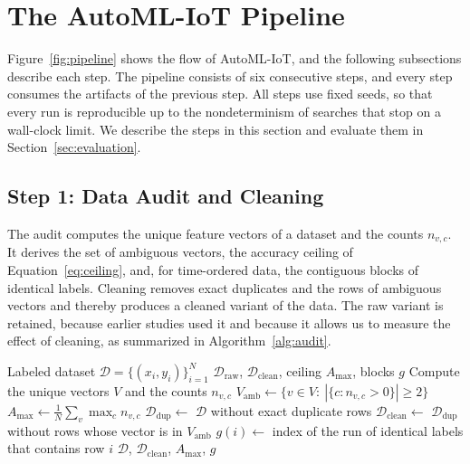 \section{The AutoML-IoT Pipeline}\label{sec:pipeline}
Figure~\ref{fig:pipeline} shows the flow of AutoML-IoT, and the following subsections describe each step. The pipeline consists of six consecutive steps, and every step consumes the artifacts of the previous step. All steps use fixed seeds, so that every run is reproducible up to the nondeterminism of searches that stop on a wall-clock limit. We describe the steps in this section and evaluate them in Section~\ref{sec:evaluation}.

\subsection{Step 1: Data Audit and Cleaning}
The audit computes the unique feature vectors of a dataset and the counts $n_{v,c}$. It derives the set of ambiguous vectors, the accuracy ceiling of Equation~\eqref{eq:ceiling}, and, for time-ordered data, the contiguous blocks of identical labels. Cleaning removes exact duplicates and the rows of ambiguous vectors and thereby produces a cleaned variant of the data. The raw variant is retained, because earlier studies used it and because it allows us to measure the effect of cleaning, as summarized in Algorithm~\ref{alg:audit}.

\begin{algorithm}[t]
\caption{Data Audit and Cleaning}
\label{alg:audit}
\footnotesize
\begin{algorithmic}[1]
\Require Labeled dataset $\mathcal{D}=\{(x_i,y_i)\}_{i=1}^{N}$
\Ensure $\mathcal{D}_{\mathrm{raw}}$, $\mathcal{D}_{\mathrm{clean}}$, ceiling $A_{\max}$, blocks $g$
\State Compute the unique vectors $V$ and the counts $n_{v,c}$
\State $V_{\mathrm{amb}}\leftarrow\{v\in V:\ |\{c: n_{v,c}>0\}|\ge 2\}$
\State $A_{\max}\leftarrow \frac{1}{N}\sum_{v}\max_{c} n_{v,c}$
\State $\mathcal{D}_{\mathrm{dup}}\leftarrow$ $\mathcal{D}$ without exact duplicate rows
\State $\mathcal{D}_{\mathrm{clean}}\leftarrow$ $\mathcal{D}_{\mathrm{dup}}$ without rows whose vector is in $V_{\mathrm{amb}}$
  \State $g(i)\leftarrow$ index of the run of identical labels that contains row $i$
\EndIf
\State \Return $\mathcal{D}$, $\mathcal{D}_{\mathrm{clean}}$, $A_{\max}$, $g$
\end{algorithmic}
\end{algorithm}

